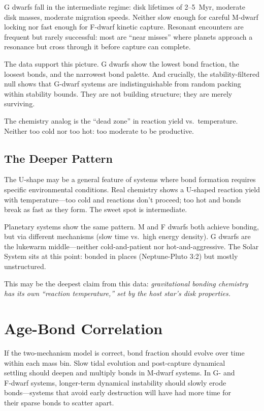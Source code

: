 \documentclass[twocolumn]{aastex631}
\begin{document}
G dwarfs fall in the intermediate regime: disk lifetimes of 2--5~Myr, moderate
disk masses, moderate migration speeds. Neither slow enough for careful M-dwarf
locking nor fast enough for F-dwarf kinetic capture. Resonant encounters are
frequent but rarely successful: most are ``near misses'' where planets approach
a resonance but cross through it before capture can complete.

The data support this picture. G dwarfs show the lowest bond fraction, the
loosest bonds, and the narrowest bond palette. And crucially, the
stability-filtered null shows that G-dwarf systems are indistinguishable from
random packing within stability bounds. They are not building structure; they
are merely surviving.

The chemistry analog is the ``dead zone'' in reaction yield vs.\ temperature.
Neither too cold nor too hot: too moderate to be productive.

\subsection{The Deeper Pattern}

The U-shape may be a general feature of systems where bond formation requires
specific environmental conditions. Real chemistry shows a U-shaped reaction
yield with temperature---too cold and reactions don't proceed; too hot and
bonds break as fast as they form. The sweet spot is intermediate.

Planetary systems show the same pattern. M and F dwarfs both achieve bonding,
but via different mechanisms (slow time vs.\ high energy density). G dwarfs are
the lukewarm middle---neither cold-and-patient nor hot-and-aggressive. The
Solar System sits at this point: bonded in places (Neptune-Pluto 3:2) but
mostly unstructured.

This may be the deepest claim from this data: \textit{gravitational bonding
chemistry has its own ``reaction temperature,'' set by the host star's disk
properties.}

\section{Age-Bond Correlation}
\label{sec:agebond}

If the two-mechanism model is correct, bond fraction should evolve over time\\
within each mass bin. Slow tidal evolution and post-capture dynamical\\
settling should deepen and multiply bonds in M-dwarf systems. In G- and\\
F-dwarf systems, longer-term dynamical instability should slowly erode\\
bonds---systems that avoid early destruction will have had more time for\\
their sparse bonds to scatter apart.
\end{document}

